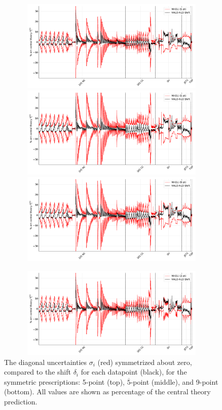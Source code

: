 \begin{figure}[t!]
  \begin{center}
    \includegraphics[width=14cm, height=4.4cm]{mhous/plots/shift_diag_cov_comparison_5pt_global.pdf}
    \includegraphics[width=14cm, height=4.4cm]{mhous/plots/shift_diag_cov_comparison_5barpt_global.pdf}
    \includegraphics[width=14cm, height=4.4cm]{mhous/plots/shift_diag_cov_comparison_9pt_global.pdf}
    \caption{\small The diagonal uncertainties  $\sigma_i$ (red)
      symmetrized about zero,
      compared to the shift $\delta_i$ for each
      datapoint (black), for the symmetric prescriptions:  5-point (top),
      $\overline{5}$-point (middle), and 9-point (bottom). All values
      are shown as percentage of the central theory prediction.}
    \label{fig:diag_shift_validation_symmetric}
  \end{center}
  \begin{center}
    \includegraphics[width=14cm, height=4.4cm]{mhous/plots/shift_diag_cov_comparison_3pt_global.pdf}

\end{center}
\end{figure}

